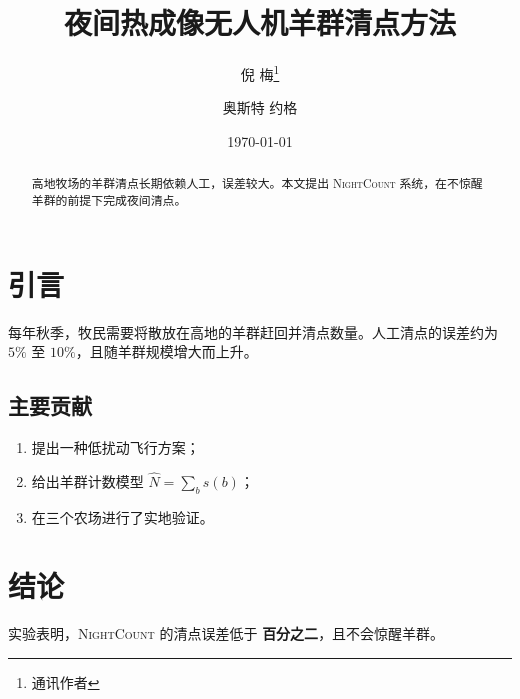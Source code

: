 \documentclass[UTF8,a4paper]{ctexart}
\title{夜间热成像无人机羊群清点方法}
\author{倪 梅\thanks{通讯作者} \and 奥斯特 约格}
\date{\today}
\newcommand{\sys}{\textsc{NightCount}}
\begin{document}
\maketitle
\begin{abstract}
高地牧场的羊群清点长期依赖人工，误差较大。本文提出 \sys{} 系统，在不惊醒羊群的前提下完成夜间清点。
\end{abstract}
\section{引言}
每年秋季，牧民需要将散放在高地的羊群赶回并清点数量。人工清点的误差约为 $5\%$ 至 $10\%$，且随羊群规模增大而上升。
\subsection{主要贡献}
\begin{enumerate}
  \item 提出一种低扰动飞行方案；
  \item 给出羊群计数模型 $\hat{N} = \sum_b s(b)$；
  \item 在三个农场进行了实地验证。
\end{enumerate}
\section{结论}
实验表明，\sys{} 的清点误差低于 \textbf{百分之二}，且不会惊醒羊群。
\end{document}
